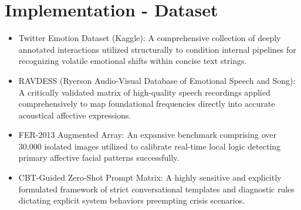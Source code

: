 \documentclass[11pt]{report}
\begin{document}
\section{Implementation - Dataset}
\begin{itemize}
    \item Twitter Emotion Dataset (Kaggle): A comprehensive collection of deeply annotated interactions utilized structurally to condition internal pipelines for recognizing volatile emotional shifts within concise text strings.
    \item RAVDESS (Ryerson Audio-Visual Database of Emotional Speech and Song): A critically validated matrix of high-quality speech recordings applied comprehensively to map foundational frequencies directly into accurate acoustical affective expressions.
    \item FER-2013 Augmented Array: An expansive benchmark comprising over 30,000 isolated images utilized to calibrate real-time local logic detecting primary affective facial patterns successfully.
    \item CBT-Guided Zero-Shot Prompt Matrix: A highly sensitive and explicitly formulated framework of strict conversational templates and diagnostic rules dictating explicit system behaviors preempting crisis scenarios.
\end{itemize}
\end{document}
